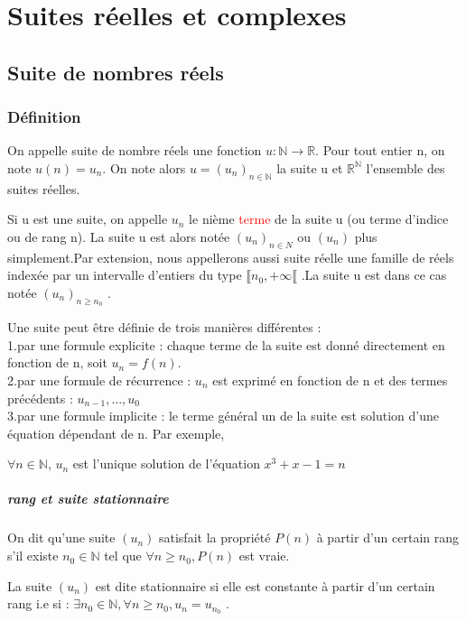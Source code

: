 \documentclass[12pt]{book}
\theoremstyle{definition}\newtheorem{dfn}{Définition}[chapter]
\theoremstyle{plain}\newtheorem{thm}{Théorème}[chapter]
\theoremstyle{plain}\newtheorem{prp}{Proposition}[chapter]
\theoremstyle{plain}\newtheorem{lem}{\bf Lemme}[chapter]
\theoremstyle{plain}\newtheorem{axm}{\bf Axiome}[chapter]
\theoremstyle{plain}\newtheorem{lmm}{\bf Lemme}[chapter]
\theoremstyle{plain}\newtheorem{exm}{\bf Example}[chapter]
\theoremstyle{plain}\newtheorem{cor}{\bf Corollaire}[chapter]
\theoremstyle{remark}\newtheorem{rem}{Remarque}[chapter]
\begin{document}
        \chapter{Suites réelles et complexes}
        \section{Suite de nombres réels}
        \subsection{Définition}
        On appelle suite de nombre réels une fonction $u:\mathbb{N}\to\mathbb{R}$. Pour tout entier n, on note $u(n) = u_n$.
        On note alors $u = (u_n)_{n\in\mathbb{N}}$ la suite u et $\mathbb{R}^\mathbb{N}$ l'ensemble des suites réelles.


        Si u est une suite, on appelle $u_n$ le nième \textcolor{red}{terme} de la suite u (ou terme d'indice ou de rang n). La suite u est alors notée $(u_n)_{n\in N}$ ou $(u_n)$ plus simplement.Par extension, nous appellerons aussi suite réelle une famille de réels indexée par un intervalle d'entiers
        du type $\llbracket n_0, + \infty \llbracket$ .La suite u est dans ce cas notée $(u_n)_{n\ge n_0}$ .

        Une suite peut être  déﬁnie de trois manières différentes :
        \\1.par une formule explicite : chaque terme de la suite est donné directement en fonction de n, soit $u_n = f(n)$.
        \\2.par une formule de récurrence : $u_n$ est exprimé en fonction de n et des termes précédents : $u_{n−1}, ... ,u_0$
        \\3.par une formule implicite : le terme général un de la suite est solution d’une équation dépendant de n. Par exemple,

        $\forall n \in \mathbb{N}$, $u_n$ est l'unique solution de l'équation $x^3+x-1=n$


        \paragraph{rang et suite stationnaire}
        On dit qu'une suite $(u_n)$ satisfait la propriété $P(n)$ à partir d'un certain rang s'il existe $n_0 \in \mathbb{N}$ tel que
        $\forall n \ge n_0, P(n)$ est vraie.

        La suite $(u_n)$ est dite stationnaire si elle est constante à partir d’un certain rang i.e si :
        $\exists n_0 \in \mathbb{N}, \forall n \ge n_0, u_n = u_{n_0}$ .
\end{document}
